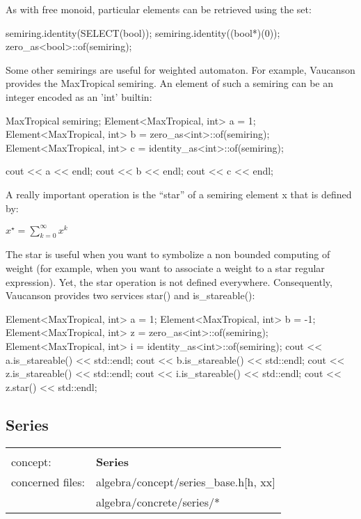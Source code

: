 \documentclass{article}
\begin{document}
\begin{code}
As with free monoid, particular elements can be retrieved using the set:

\begin{code}
semiring.identity(SELECT(bool));
semiring.identity((bool*)(0));
zero_as<bool>::of(semiring);
\end{code}

Some other semirings are useful for weighted automaton. For example,
Vaucanson provides the MaxTropical semiring. An element of such a
semiring can be an integer encoded as an 'int' builtin:

\begin{code}
MaxTropical semiring;
Element<MaxTropical, int> a = 1;
Element<MaxTropical, int> b = zero_as<int>::of(semiring);
Element<MaxTropical, int> c = identity_as<int>::of(semiring);

cout << a << endl;
cout << b << endl;
cout << c << endl;

\end{code}

A really important operation is the ``star'' of a semiring element x
that is defined by:

\begin{center}
\begin{math}
x^{\star} = \sum_{k=0}^{\infty}{x^k}
\end{math}
\end{center}
The star is useful when you want to symbolize a non bounded computing
of weight (for example, when you want to associate a weight to a star
regular expression). Yet, the star operation is not defined everywhere.
Consequently, Vaucanson provides two services star() and is\_stareable():

\begin{code}
Element<MaxTropical, int> a = 1;
Element<MaxTropical, int> b = -1;
Element<MaxTropical, int> z = zero_as<int>::of(semiring);
Element<MaxTropical, int> i = identity_as<int>::of(semiring);
cout << a.is_stareable() << std::endl;
cout << b.is_stareable() << std::endl;
cout << z.is_stareable() << std::endl;
cout << i.is_stareable() << std::endl;
cout << z.star() << std::endl;
\end{code}

\subsection{Series}

\begin{tabular}%
{ll}
\hline \\
concept: & \textbf{Series}  \\
concerned files: & algebra/concept/series\_base.h[h, xx] \\
                 & algebra/concrete/series/* \\
\hline 
\end{tabular}


\end{code}
\end{document}
